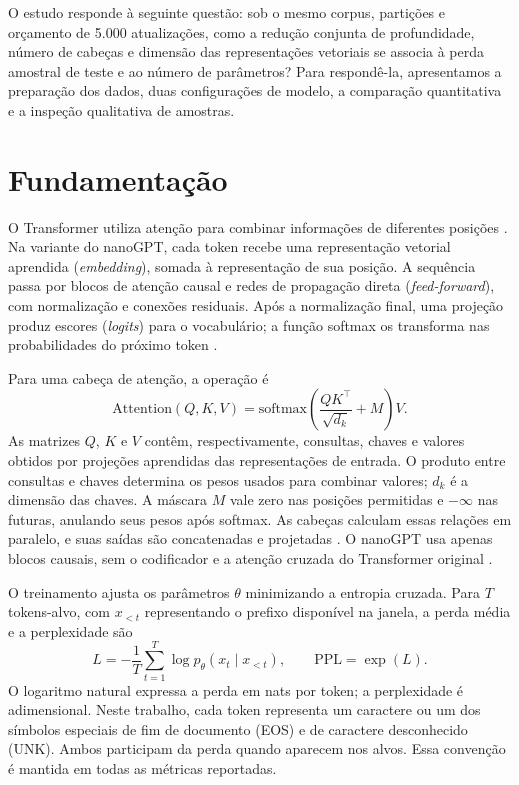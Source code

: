 \documentclass[conference]{IEEEtran}
\begin{document}
O estudo responde à seguinte questão: sob o mesmo corpus, partições e orçamento de 5.000 atualizações, como a redução conjunta de profundidade, número de cabeças e dimensão das representações vetoriais se associa à perda amostral de teste e ao número de parâmetros? Para respondê-la, apresentamos a preparação dos dados, duas configurações de modelo, a comparação quantitativa e a inspeção qualitativa de amostras.

\section{Fundamentação}

O Transformer utiliza atenção para combinar informações de diferentes posições \cite{vaswani2017}. Na variante do nanoGPT, cada token recebe uma representação vetorial aprendida (\textit{embedding}), somada à representação de sua posição. A sequência passa por blocos de atenção causal e redes de propagação direta (\textit{feed-forward}), com normalização e conexões residuais. Após a normalização final, uma projeção produz escores (\textit{logits}) para o vocabulário; a função softmax os transforma nas probabilidades do próximo token \cite{karpathyNanoGPT}.

Para uma cabeça de atenção, a operação é
\begin{equation}
\mathrm{Attention}(Q,K,V)=\mathrm{softmax}\left(\frac{QK^\top}{\sqrt{d_k}}+M\right)V.
\end{equation}
As matrizes $Q$, $K$ e $V$ contêm, respectivamente, consultas, chaves e valores obtidos por projeções aprendidas das representações de entrada. O produto entre consultas e chaves determina os pesos usados para combinar valores; $d_k$ é a dimensão das chaves. A máscara $M$ vale zero nas posições permitidas e $-\infty$ nas futuras, anulando seus pesos após softmax. As cabeças calculam essas relações em paralelo, e suas saídas são concatenadas e projetadas \cite{vaswani2017}. O nanoGPT usa apenas blocos causais, sem o codificador e a atenção cruzada do Transformer original \cite{karpathyNanoGPT}.

O treinamento ajusta os parâmetros $\theta$ minimizando a entropia cruzada. Para $T$ tokens-alvo, com $x_{<t}$ representando o prefixo disponível na janela, a perda média e a perplexidade são
\begin{equation}
L=-\frac{1}{T}\sum_{t=1}^{T}\log p_\theta(x_t\mid x_{<t}),\qquad \mathrm{PPL}=\exp(L).
\end{equation}
O logaritmo natural expressa a perda em nats por token; a perplexidade é adimensional. Neste trabalho, cada token representa um caractere ou um dos símbolos especiais de fim de documento (EOS) e de caractere desconhecido (UNK). Ambos participam da perda quando aparecem nos alvos. Essa convenção é mantida em todas as métricas reportadas.
\end{document}

